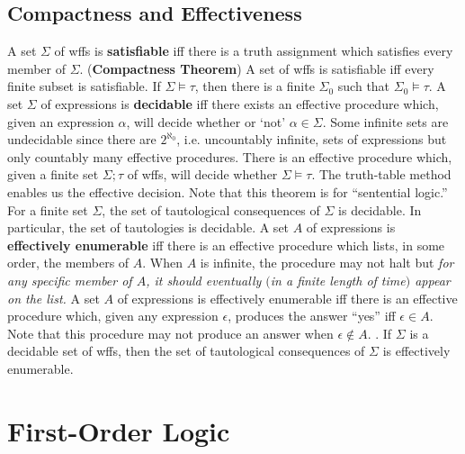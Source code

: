 \documentclass{myproc}
\begin{document}
\subsection{Compactness and Effectiveness}
\bit
\w A set $\Sigma$ of wffs is {\bf{}satisfiable} iff there is a 
	truth assignment which satisfies every member of $\Sigma$.
\w ({\bf{}Compactness Theorem}) A set of wffs is satisfiable 
	iff every finite subset is satisfiable.
\w If $\Sigma \models \tau$, then there is a finite $\Sigma_0$
	such that $\Sigma_0 \models \tau$.
\w A set $\Sigma$ of expressions is {\bf{}decidable} iff there
	exists an effective procedure which, given an expression
	$\alpha$, will decide whether or `not' $\alpha \in \Sigma$.
	\bit
	\w Some infinite sets are undecidable since there are 
		$2^{\aleph_0}$, i.e. uncountably infinite, 
		sets of expressions but only countably
		many effective procedures.
	\eit
\w There is an effective procedure which, given a finite
	set $\Sigma; \tau$ of wffs, will decide whether 
	$\Sigma \models \tau$.
	\bit
	\w The truth-table method enables us the effective decision.
	\w Note that this theorem is for ``sentential logic.''
	\eit
\w For a finite set $\Sigma$, the set of tautological consequences
	of $\Sigma$ is decidable. In particular, the set of 
	tautologies is decidable.
\w A set $A$ of expressions is {\bf{}effectively enumerable} iff
	there is an effective procedure which lists, in some order,
	the members of $A$.
	\bit
	\w When $A$ is infinite, the procedure may not halt but {\em{}for
		any specific member of $A$, it should eventually
		$($in a finite length of time$)$
		appear on the list.}
	\eit
\w A set $A$ of expressions is effectively enumerable iff there
	is an effective procedure which, given any expression $\epsilon$,
	produces the answer ``yes'' iff $\epsilon \in A$.
	\bit
	\w Note that this procedure may not produce an answer when 
		$\epsilon \not\in A$.
	\eit
{}.
\w If $\Sigma$ is a decidable set of wffs, then the set of tautological
	consequences of $\Sigma$ is effectively enumerable.
\eit


\section{First-Order Logic}
\end{document}
